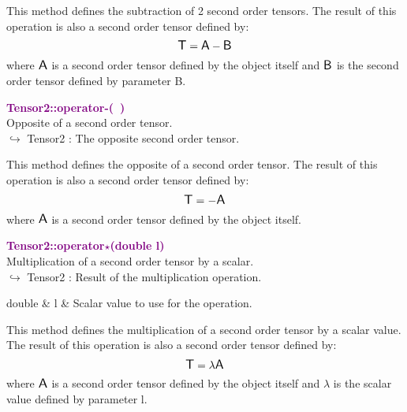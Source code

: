 This method defines the subtraction of 2 second order tensors.
The result of this operation is also a second order tensor defined by:
\begin{equation*}
\mbox{\large\ensuremath{\mathsf{T}}} = \mbox{\large\ensuremath{\mathsf{A}}} - \mbox{\large\ensuremath{\mathsf{B}}}
\end{equation*}
where $\mbox{\large\ensuremath{\mathsf{A}}}$ is a second order tensor defined by the object itself and $\mbox{\large\ensuremath{\mathsf{B}}}$ is the second order tensor defined by parameter B.

\textcolor{purple}{\textbf{Tensor2::operator-(~)}}\label{Tensor2::operator-()}\\
Opposite of a second order tensor.\\ \hspace*{10mm}$\hookrightarrow$ Tensor2 : The opposite second order tensor.

This method defines the opposite of a second order tensor.
The result of this operation is also a second order tensor defined by:
\begin{equation*}
\mbox{\large\ensuremath{\mathsf{T}}} = - \mbox{\large\ensuremath{\mathsf{A}}}
\end{equation*}
where $\mbox{\large\ensuremath{\mathsf{A}}}$ is a second order tensor defined by the object itself.

\textcolor{purple}{\textbf{Tensor2::operator$\star$(double l)}}\label{Tensor2::operator*(double l)}\\
Multiplication of a second order tensor by a scalar.\\ \hspace*{10mm}$\hookrightarrow$ Tensor2 : Result of the multiplication operation.

\begin{tcolorbox}[width=\textwidth,myArgs,tabularx={ll|R}]
double & l & Scalar value to use for the operation.
\end{tcolorbox}

This method defines the multiplication of a second order tensor by a scalar value.
The result of this operation is also a second order tensor defined by:
\begin{equation*}
\mbox{\large\ensuremath{\mathsf{T}}} = \lambda \mbox{\large\ensuremath{\mathsf{A}}}
\end{equation*}
where $\mbox{\large\ensuremath{\mathsf{A}}}$ is a second order tensor defined by the object itself and $\lambda$ is the scalar value defined by parameter l.

